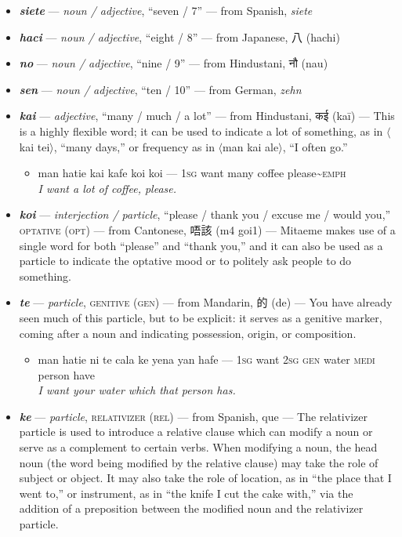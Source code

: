 \documentclass[a4paper]{article}
\begin{document}
\begin{itemize}
	\item \textbf{\textit{siete}} —  \textit{noun / adjective}, ``seven / 7'' — from Spanish, \textit{siete}
	\item \textbf{\textit{haci}} —  \textit{noun / adjective}, ``eight / 8'' — from Japanese, 八 (hachi)
	\item \textbf{\textit{no}} —  \textit{noun / adjective}, ``nine / 9'' — from Hindustani, {\hmfont नौ} (nau)
	\item \textbf{\textit{sen}} —  \textit{noun / adjective}, ``ten / 10'' — from German, \textit{zehn}
	\item \textbf{\textit{kai}} —  \textit{adjective}, ``many / much / a lot'' — from Hindustani, {\hmfont कई} (kaī) — This is a highly flexible word; it can be used to indicate a lot of something, as in $\langle$kai tei$\rangle$, ``many days,'' or frequency as in $\langle$man kai ale$\rangle$, ``I often go.''
	\begin{itemize}
		\item man hatie kai kafe koi koi — \textsc{1sg} want many coffee please\textasciitilde{}\textsc{emph} \\\textit{I want a lot of coffee, please.}
	\end{itemize}
	\item \textbf{\textit{koi}} —  \textit{interjection / particle}, ``please / thank you / excuse me / would you,'' \textsc{optative (opt)} — from Cantonese, 唔該 (m4 goi1) — Mitaeme makes use of a single word for both ``please'' and ``thank you,'' and it can also be used as a particle to indicate the optative mood or to politely ask people to do something.
	\item \textbf{\textit{te}} —  \textit{particle}, \textsc{genitive (gen)} — from Mandarin, 的 (de) — You have already seen much of this particle, but to be explicit: it serves as a genitive marker, coming after a noun and indicating possession, origin, or composition.
	\begin{itemize}
		\item man hatie ni te cala ke yena yan hafe — \textsc{1sg} want \textsc{2sg gen} water \textsc{medi} person have \\\textit{I want your water which that person has.}
	\end{itemize}
	\item \textbf{\textit{ke}} —  \textit{particle}, \textsc{relativizer (rel)} — from Spanish, que — The relativizer particle is used to introduce a relative clause which can modify a noun or serve as a complement to certain verbs. When modifying a noun, the head noun (the word being modified by the relative clause) may take the role of subject or object. It may also take the role of location, as in ``the place that I went to,'' or instrument, as in ``the knife I cut the cake with,'' via the addition of a preposition between the modified noun and the relativizer particle.

\end{itemize}
\end{document}
